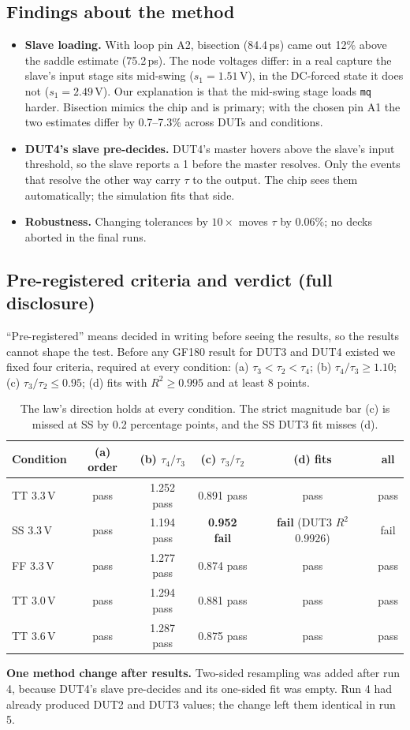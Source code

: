 \documentclass[11pt]{article}
\begin{document}
\subsection{Findings about the method}
\begin{itemize}
\item \textbf{Slave loading.} With loop pin A2, bisection (84.4\,ps) came out 12\% above the saddle estimate
  (75.2\,ps). The node voltages differ: in a real capture the slave's input stage sits mid-swing ($s_1=1.51$\,V),
  in the DC-forced state it does not ($s_1=2.49$\,V). Our explanation is that the mid-swing stage loads \texttt{mq}
  harder. Bisection mimics the chip and is primary; with the chosen pin A1 the two estimates differ by 0.7--7.3\% across DUTs and conditions.
\item \textbf{DUT4's slave pre-decides.} DUT4's master hovers above the slave's input threshold, so the slave
  reports a 1 before the master resolves. Only the events that resolve the other way carry $\tau$ to the output.
  The chip sees them automatically; the simulation fits that side.
\item \textbf{Robustness.} Changing tolerances by $10\times$ moves $\tau$ by 0.06\%; no decks aborted in the final
  runs.
\end{itemize}

\subsection{Pre-registered criteria and verdict (full disclosure)}
``Pre-registered'' means decided in writing before seeing the results, so the results cannot shape the test.
Before any GF180 result for DUT3 and DUT4 existed we fixed four criteria, required at every condition:
(a) $\tau_3<\tau_2<\tau_4$; (b) $\tau_4/\tau_3\ge1.10$; (c) $\tau_3/\tau_2\le0.95$; (d) fits with $R^2\ge0.995$ and at
least 8 points.
\begin{table}[H]
\centering\small
\begin{tabular}{@{}lccccc@{}}
\toprule
Condition & (a) order & (b) $\tau_4/\tau_3$ & (c) $\tau_3/\tau_2$ & (d) fits & all \\
\midrule
TT 3.3\,V & pass & 1.252 pass & 0.891 pass & pass & pass \\
SS 3.3\,V & pass & 1.194 pass & \textbf{0.952 fail} & \textbf{fail} (DUT3 $R^2$ 0.9926) & fail \\
FF 3.3\,V & pass & 1.277 pass & 0.874 pass & pass & pass \\
TT 3.0\,V & pass & 1.294 pass & 0.881 pass & pass & pass \\
TT 3.6\,V & pass & 1.287 pass & 0.875 pass & pass & pass \\
\bottomrule
\end{tabular}
\caption{The law's direction holds at every condition. The strict magnitude bar (c) is missed at SS by 0.2
percentage points, and the SS DUT3 fit misses (d).}
\end{table}
\textbf{One method change after results.} Two-sided resampling was added after run 4, because DUT4's slave
pre-decides and its one-sided fit was empty. Run 4 had already produced DUT2 and DUT3 values; the change left them
identical in run 5.
\end{document}
